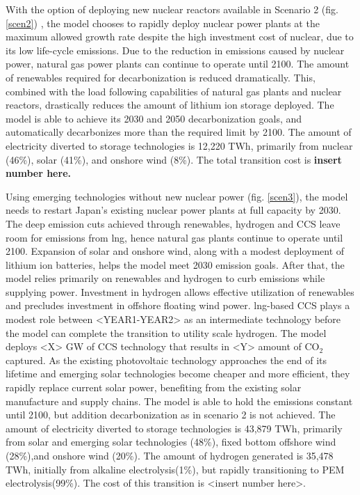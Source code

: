 With the option of deploying new nuclear reactors available in Scenario 2 (fig. \ref{scen2}) , the model chooses to rapidly deploy nuclear power plants at the maximum allowed growth rate despite the high investment cost of nuclear, due to its low life-cycle emissions. Due to the reduction in emissions caused by nuclear power, natural gas power plants can continue to operate until 2100. The amount of renewables required for decarbonization is reduced dramatically. This, combined with the load following capabilities of natural gas plants and nuclear reactors, drastically reduces the amount of lithium ion storage deployed. The model is able to achieve its 2030 and 2050 decarbonization goals, and automatically decarbonizes more than the required limit by 2100. The amount of electricity diverted to storage technologies is 12,220 TWh, primarily from nuclear (46\%), solar (41\%), and onshore wind (8\%). The total transition cost is \textbf{insert number here.}

Using emerging technologies without new nuclear power (fig. \ref{scen3}), the model needs to restart Japan's existing nuclear power plants at full capacity by 2030. The deep emission cuts achieved through renewables, hydrogen and \gls{CCS} leave room for emissions from \gls{lng}, hence natural gas plants continue to operate until 2100. Expansion of solar and onshore wind, along with a modest deployment of lithium ion batteries, helps the model meet 2030 emission goals. After that, the model relies primarily on renewables and hydrogen to curb emissions while supplying power. Investment in hydrogen allows effective utilization of renewables and precludes investment in offshore floating wind power. \gls{lng}-based \gls{CCS} plays a modest role between <YEAR1-YEAR2> as an intermediate technology before the model can complete the transition to utility scale hydrogen. The model deploys <X> GW of \gls{CCS} technology that results in <Y> amount of CO$_2$ captured. As the existing photovoltaic technology approaches the end of its lifetime and emerging solar technologies become cheaper and more efficient, they rapidly replace current solar power, benefiting from the existing solar manufacture and supply chains. The model is able to hold the emissions constant until 2100, but addition decarbonization as in scenario 2 is not achieved. The amount of electricity diverted to storage technologies is 43,879 TWh, primarily from solar and emerging solar technologies (48\%), fixed bottom offshore wind (28\%),and onshore wind (20\%). The amount of hydrogen generated is 35,478 TWh, initially from alkaline electrolysis(1\%), but rapidly transitioning to PEM electrolysis(99\%). The cost of this transition is <insert number here>.

